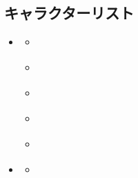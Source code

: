 \documentclass[letterpaper,10pt,dvipdfmx]{sphinxmanual}
\begin{document}
\subsection{キャラクターリスト}
\label{\detokenize{auto/actionlist:characterlist-act}}\label{\detokenize{auto/actionlist:id42}}
\begin{sphinxShadowBox}
\begin{itemize}
\item {} 
\sphinxAtStartPar
{}\label{\detokenize{auto/actionlist:id99}}{\hyperref[\detokenize{auto/actionlist:id44}]{}}
\begin{itemize}
\item {} 
\sphinxAtStartPar
{}\label{\detokenize{auto/actionlist:id100}}{\hyperref[\detokenize{auto/actionlist:char-soldier}]{}}

\item {} 
\sphinxAtStartPar
{}\label{\detokenize{auto/actionlist:id101}}{\hyperref[\detokenize{auto/actionlist:char-hero}]{}}

\item {} 
\sphinxAtStartPar
{}\label{\detokenize{auto/actionlist:id102}}{\hyperref[\detokenize{auto/actionlist:char-ace}]{}}

\item {} 
\sphinxAtStartPar
{}\label{\detokenize{auto/actionlist:id103}}{\hyperref[\detokenize{auto/actionlist:char-magician}]{}}

\item {} 
\sphinxAtStartPar
{}\label{\detokenize{auto/actionlist:id104}}{\hyperref[\detokenize{auto/actionlist:char-armedsoldier}]{}}

\end{itemize}

\item {} 
\sphinxAtStartPar
{}\label{\detokenize{auto/actionlist:id105}}{\hyperref[\detokenize{auto/actionlist:id50}]{}}
\begin{itemize}
\item {} 
\sphinxAtStartPar
{}\label{\detokenize{auto/actionlist:id106}}{\hyperref[\detokenize{auto/actionlist:char-bulwark}]{}}

\end{itemize}

\end{itemize}
\end{sphinxShadowBox}
\end{document}
